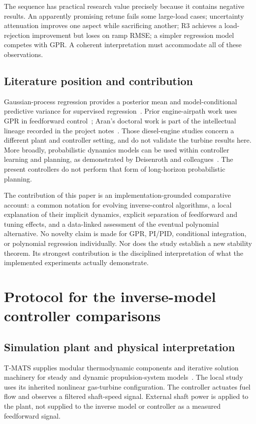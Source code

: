 The sequence has practical research value precisely because it contains negative results. An apparently promising retune fails some large-load cases; uncertainty attenuation improves one aspect while sacrificing another; R3 achieves a load-rejection improvement but loses on ramp RMSE; a simpler regression model competes with GPR. A coherent interpretation must accommodate all of these observations.

\section{Literature position and contribution}
Gaussian-process regression provides a posterior mean and model-conditional predictive variance for supervised regression~\cite{gpml}. Prior engine-airpath work uses GPR in feedforward control~\cite{aran}; Aran's doctoral work is part of the intellectual lineage recorded in the project notes~\cite{aranthesis}. Those diesel-engine studies concern a different plant and controller setting, and do not validate the turbine results here. More broadly, probabilistic dynamics models can be used within controller learning and planning, as demonstrated by Deisenroth and colleagues~\cite{deisenroth}. The present controllers do not perform that form of long-horizon probabilistic planning.

The contribution of this paper is an implementation-grounded comparative account: a common notation for evolving inverse-control algorithms, a local explanation of their implicit dynamics, explicit separation of feedforward and tuning effects, and a data-linked assessment of the eventual polynomial alternative. No novelty claim is made for GPR, PI/PID, conditional integration, or polynomial regression individually. Nor does the study establish a new stability theorem. Its strongest contribution is the disciplined interpretation of what the implemented experiments actually demonstrate.


\chapter{Protocol for the inverse-model controller comparisons}
\section{Simulation plant and physical interpretation}
T-MATS supplies modular thermodynamic components and iterative solution machinery for steady and dynamic propulsion-system models~\cite{tmats,tmatscode}. The local study uses its inherited nonlinear gas-turbine configuration. The controller actuates fuel flow and observes a filtered shaft-speed signal. External shaft power is applied to the plant, not supplied to the inverse model or controller as a measured feedforward signal.

